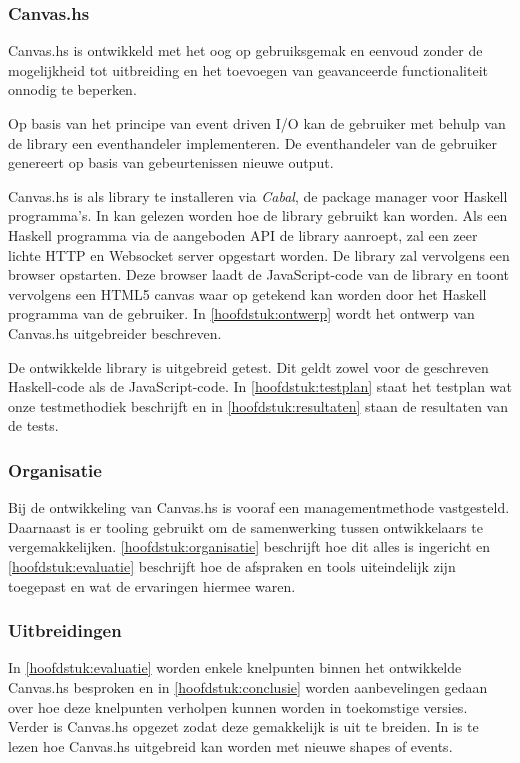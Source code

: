 \subsubsection{Canvas.hs}
Canvas.hs is ontwikkeld met het oog op gebruiksgemak en eenvoud zonder de mogelijkheid tot uitbreiding en het toevoegen van geavanceerde functionaliteit onnodig te beperken. 

Op basis van het principe van event driven I/O kan de gebruiker met behulp van de library een eventhandeler implementeren. De eventhandeler van de gebruiker genereert op basis van gebeurtenissen nieuwe output.

Canvas.hs is als library te installeren via \emph{Cabal}, de package manager voor Haskell programma's. In  kan gelezen worden hoe de library gebruikt kan worden. Als een Haskell programma via de aangeboden API de library aanroept, zal een zeer lichte HTTP en Websocket server opgestart worden. De library zal vervolgens een browser opstarten. Deze browser laadt de JavaScript-code van de library en toont vervolgens een HTML5 canvas waar op getekend kan worden door het Haskell programma van de gebruiker. In \autoref{hoofdstuk:ontwerp} wordt het ontwerp van Canvas.hs uitgebreider beschreven.

De ontwikkelde library is uitgebreid getest. Dit geldt zowel voor de geschreven Haskell-code als de JavaScript-code. In \autoref{hoofdstuk:testplan} staat het testplan wat onze testmethodiek beschrijft en in \autoref{hoofdstuk:resultaten} staan de resultaten van de tests.

\subsubsection{Organisatie}
Bij de ontwikkeling van Canvas.hs is vooraf een managementmethode vastgesteld. Daarnaast is er tooling gebruikt om de samenwerking tussen ontwikkelaars te vergemakkelijken. \autoref{hoofdstuk:organisatie} beschrijft hoe dit alles is ingericht en \autoref{hoofdstuk:evaluatie} beschrijft hoe de afspraken en tools uiteindelijk zijn toegepast en wat de ervaringen hiermee waren.

\subsubsection{Uitbreidingen}
In \autoref{hoofdstuk:evaluatie} worden enkele knelpunten binnen het ontwikkelde Canvas.hs besproken en in \autoref{hoofdstuk:conclusie} worden aanbevelingen gedaan over hoe deze knelpunten verholpen kunnen worden in toekomstige versies. Verder is Canvas.hs opgezet zodat deze gemakkelijk is uit te breiden. In  is te lezen hoe Canvas.hs uitgebreid kan worden met nieuwe shapes of events.


